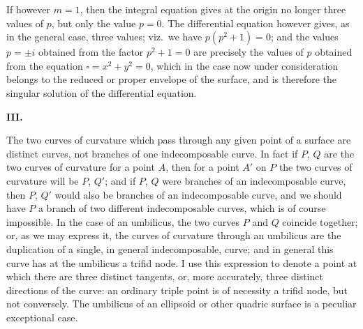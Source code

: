 \documentclass[11pt,a4paper]{article}
\theoremstyle{plain}
\begin{document}
If however $m = 1$, then the integral equation gives at the origin no longer three values of $p$, but only the value $p = 0$. The differential equation however gives, as in the general case, three values; viz.\ we have $p(p^2 + 1) = 0$; and the values $p = \pm i$ obtained from the factor $p^2 + 1 = 0$ are precisely the values of $p$ obtained from the equation $\square = x^2 + y^2 = 0$, which in the case now under consideration belongs to the reduced or proper envelope of the surface, and is therefore the singular solution of the differential equation.

\begin{center}\textbf{III.}\end{center}

The two curves of curvature which pass through any given point of a surface are distinct curves, not branches of one indecomposable curve. In fact if $P$, $Q$ are the two curves of curvature for a point $A$, then for a point $A'$ on $P$ the two curves of
\newpage
curvature will be $P$, $Q'$; and if $P$, $Q$ were branches of an indecomposable curve, then $P$, $Q'$ would also be branches of an indecomposable curve, and we should have $P$ a branch of two different indecomposable curves, which is of course impossible. In the case of an umbilicus, the two curves $P$ and $Q$ coincide together; or, as we may express it, the curves of curvature through an umbilicus are the duplication of a single, in general indecomposable, curve; and in general this curve has at the umbilicus a trifid node. I use this expression to denote a point at which there are three distinct tangents, or, more accurately, three distinct directions of the curve: an ordinary triple point is of necessity a trifid node, but not conversely. The umbilicus of an ellipsoid or other quadric surface is a peculiar exceptional case.
\end{document}
